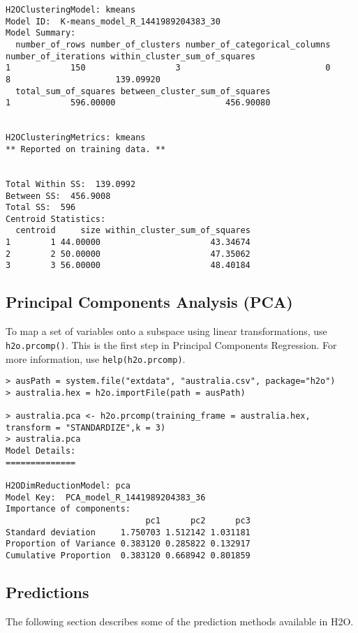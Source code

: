 {{\begin{lstlisting}[style=R]
H2OClusteringModel: kmeans
Model ID:  K-means_model_R_1441989204383_30 
Model Summary:
  number_of_rows number_of_clusters number_of_categorical_columns number_of_iterations within_cluster_sum_of_squares
1            150                  3                             0                    8                     139.09920
  total_sum_of_squares between_cluster_sum_of_squares
1            596.00000                      456.90080


H2OClusteringMetrics: kmeans
** Reported on training data. **


Total Within SS:  139.0992
Between SS:  456.9008
Total SS:  596 
Centroid Statistics:
  centroid     size within_cluster_sum_of_squares
1        1 44.00000                      43.34674
2        2 50.00000                      47.35062
3        3 56.00000                      48.40184
\end{lstlisting}

\subsection{Principal Components Analysis (PCA)}

To map a set of variables onto a subspace using linear transformations, use {\texttt{h2o.prcomp()}}. This is the first step in Principal Components Regression. For more information, use {\texttt{help(h2o.prcomp)}}.
\smallskip
\begin{lstlisting}[style=R]
> ausPath = system.file("extdata", "australia.csv", package="h2o")
> australia.hex = h2o.importFile(path = ausPath)

> australia.pca <- h2o.prcomp(training_frame = australia.hex, transform = "STANDARDIZE",k = 3)
> australia.pca
Model Details:
==============

H2ODimReductionModel: pca
Model Key:  PCA_model_R_1441989204383_36 
Importance of components:
                            pc1      pc2      pc3
Standard deviation     1.750703 1.512142 1.031181
Proportion of Variance 0.383120 0.285822 0.132917
Cumulative Proportion  0.383120 0.668942 0.801859
\end{lstlisting}

\subsection{Predictions}
\label{ssec:Predictions}

The following section describes some of the prediction methods available in H2O. 

}}
